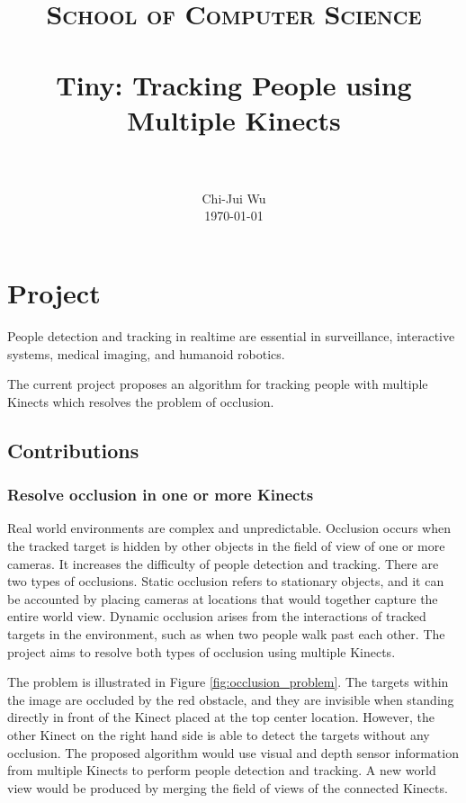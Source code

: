 \documentclass[paper=a4, fontsize=11pt]{scrartcl}
\title{
		\vspace{-3ex}
		\usefont{OT1}{bch}{b}{n}
		\normalfont \normalsize \textsc{School of Computer Science} \\ [25pt]
		\horrule{0.5pt} \\[0.4cm]
		\huge Tiny: Tracking People using Multiple Kinects \\
		\horrule{2pt} \\[0.5cm]
		\vspace{-2ex}
}
\author{
		\normalfont 								\normalsize
        Chi-Jui Wu\\[-3pt]		\normalsize
        \today
}
\date{}
\numberwithin{equation}{section}		%
\numberwithin{figure}{section}			%
\numberwithin{table}{section}				%
\begin{document}
\maketitle

\section{Project}

People detection and tracking in realtime are essential in surveillance, interactive systems, medical imaging, and humanoid robotics.

The current project proposes an algorithm for tracking people with multiple Kinects which resolves the problem of occlusion.

\subsection{Contributions}

\subsubsection{Resolve occlusion in one or more Kinects}

Real world environments are complex and unpredictable. Occlusion occurs when the tracked target is hidden by other objects in the field of view of one or more cameras. It increases the difficulty of people detection and tracking. There are two types of occlusions. Static occlusion refers to stationary objects, and it can be accounted by placing cameras at locations that would together capture the entire world view. Dynamic occlusion arises from the interactions of tracked targets in the environment, such as when two people walk past each other. The project aims to resolve both types of occlusion using multiple Kinects. 

The problem is illustrated in Figure \ref{fig:occlusion_problem}. The targets within the image are occluded by the red obstacle, and they are invisible when standing directly in front of the Kinect placed at the top center location. However, the other Kinect on the right hand side is able to detect the targets without any occlusion. The proposed algorithm would use visual and depth sensor information from multiple Kinects to perform people detection and tracking. A new world view would be produced by merging the field of views of the connected Kinects.
\end{document}
